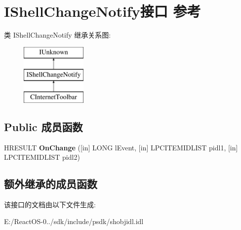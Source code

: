 \hypertarget{interface_i_shell_change_notify}{}\section{I\+Shell\+Change\+Notify接口 参考}
\label{interface_i_shell_change_notify}
类 I\+Shell\+Change\+Notify 继承关系图\+:\begin{figure}[H]
\begin{center}
\leavevmode
\includegraphics[height=3.000000cm]{interface_i_shell_change_notify}
\end{center}
\end{figure}
\subsection*{Public 成员函数}
\begin{DoxyCompactItemize}
\item 
\mbox{\label{interface_i_shell_change_notify_a045d9d69215fd99b342e17f70436aa8a}} 
H\+R\+E\+S\+U\+LT {\bfseries On\+Change} (\mbox{[}in\mbox{]} L\+O\+NG l\+Event, \mbox{[}in\mbox{]} L\+P\+C\+I\+T\+E\+M\+I\+D\+L\+I\+ST pidl1, \mbox{[}in\mbox{]} L\+P\+C\+I\+T\+E\+M\+I\+D\+L\+I\+ST pidl2)
\end{DoxyCompactItemize}
\subsection*{额外继承的成员函数}


该接口的文档由以下文件生成\+:\begin{DoxyCompactItemize}
\item 
E\+:/\+React\+O\+S-\/0../sdk/include/psdk/shobjidl.\+idl\end{DoxyCompactItemize}
